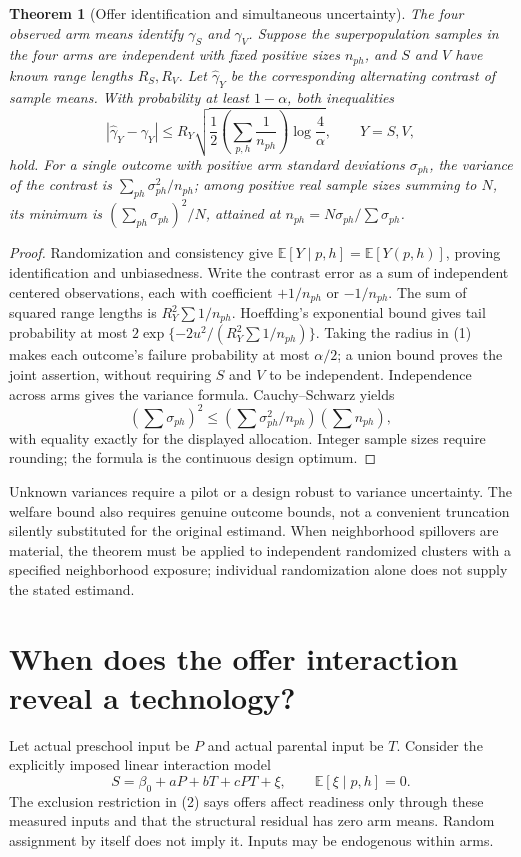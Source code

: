 \documentclass[11pt]{article}
\newtheorem{theorem}{Theorem}
\theoremstyle{remark}\newtheorem{remark}[theorem]{Remark}
\newcommand{\E}{\mathbb E}
\begin{document}
\begin{theorem}[Offer identification and simultaneous uncertainty]
The four observed arm means identify $\gamma_S$ and $\gamma_V$. Suppose the superpopulation samples in the four arms are independent with fixed positive sizes $n_{ph}$, and $S$ and $V$ have known range lengths $R_S,R_V$. Let $\widehat\gamma_Y$ be the corresponding alternating contrast of sample means. With probability at least $1-\alpha$, both inequalities
\[
 |\widehat\gamma_Y-\gamma_Y|\le
 R_Y\sqrt{\frac12\left(\sum_{p,h}\frac1{n_{ph}}\right)
 \log\frac4\alpha},\qquad Y=S,V,
 \tag{1}
\]
hold. For a single outcome with positive arm standard deviations $\sigma_{ph}$, the variance of the contrast is $\sum_{ph}\sigma_{ph}^2/n_{ph}$; among positive real sample sizes summing to $N$, its minimum is $(\sum_{ph}\sigma_{ph})^2/N$, attained at $n_{ph}=N\sigma_{ph}/\sum\sigma_{ph}$.
\end{theorem}
\begin{proof}
Randomization and consistency give $\E[Y\mid p,h]=\E[Y(p,h)]$, proving identification and unbiasedness. Write the contrast error as a sum of independent centered observations, each with coefficient $+1/n_{ph}$ or $-1/n_{ph}$. The sum of squared range lengths is $R_Y^2\sum1/n_{ph}$. Hoeffding's exponential bound gives tail probability at most $2\exp\{-2u^2/(R_Y^2\sum1/n_{ph})\}$. Taking the radius in (1) makes each outcome's failure probability at most $\alpha/2$; a union bound proves the joint assertion, without requiring $S$ and $V$ to be independent. Independence across arms gives the variance formula. Cauchy--Schwarz yields
\[
 (\sum\sigma_{ph})^2\le
 (\sum\sigma_{ph}^2/n_{ph})(\sum n_{ph}),
\]
with equality exactly for the displayed allocation. Integer sample sizes require rounding; the formula is the continuous design optimum.
\end{proof}

Unknown variances require a pilot or a design robust to variance uncertainty. The welfare bound also requires genuine outcome bounds, not a convenient truncation silently substituted for the original estimand. When neighborhood spillovers are material, the theorem must be applied to independent randomized clusters with a specified neighborhood exposure; individual randomization alone does not supply the stated estimand.

\section*{When does the offer interaction reveal a technology?}
Let actual preschool input be $P$ and actual parental input be $T$. Consider the explicitly imposed linear interaction model
\[
 S=\beta_0+aP+bT+cPT+\xi,\qquad \E[\xi\mid p,h]=0.
 \tag{2}
\]
The exclusion restriction in (2) says offers affect readiness only through these measured inputs and that the structural residual has zero arm means. Random assignment by itself does not imply it. Inputs may be endogenous within arms.
\end{document}
